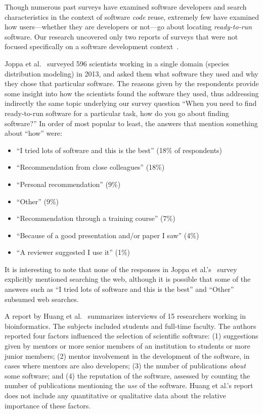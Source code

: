 \documentclass{casicswhitepaper}
\begin{document}
Though numerous past surveys have examined software developers and search characteristics in the context of software \emph{code} reuse, extremely few have examined how users---whether they are developers or not---go about locating \emph{ready-to-run} software.  Our research uncovered only two reports of surveys that were not focused specifically on a software development context~\cite{joppa2013troubling, huang2013provenance}.

Joppa et al.~\cite{joppa2013troubling} surveyed 596 scientists working in a single domain (species distribution modeling) in 2013, and asked them what software they used and why they chose that particular software.  The reasons given by the respondents provide some insight into how the scientists found the software they used, thus addressing indirectly the same topic underlying our survey question ``When you need to find ready-to-run software for a particular task, how do you go about finding software?''  In order of most popular to least, the answers that mention something about ``how'' were:
\begin{itemize}

\item ``I tried lots of software and this is the best'' (18\% of respondents)
\item ``Recommendation from close colleagues'' (18\%)
\item ``Personal recommendation'' (9\%)
\item ``Other'' (9\%)
\item ``Recommendation through a training course'' (7\%)
\item ``Because of a good presentation and/or paper I saw'' (4\%)
\item ``A reviewer suggested I use it'' (1\%)

\end{itemize}

It is interesting to note that none of the responses in Joppa et al.'s~\cite{joppa2013troubling} survey explicitly mentioned searching the web, although it is possible that some of the answers such as ``I tried lots of software and this is the best'' and ``Other'' subsumed web searches.

A report by Huang et al.~\cite{huang2013provenance} summarizes interviews of 15 researchers working in bioinformatics.  The subjects included students and full-time faculty.  The authors reported four factors influenced the selection of scientific software: (1) suggestions given by mentors or more senior members of an institution to students or more junior members; (2) mentor involvement in the development of the software, in cases where mentors are also developers; (3) the number of publications \emph{about} some software; and (4) the reputation of the software, assessed by counting the number of publications mentioning the \emph{use} of the software.  Huang et al.'s report~\cite{huang2013provenance} does not include any quantitative or qualitative data about the relative importance of these factors.
\end{document}
